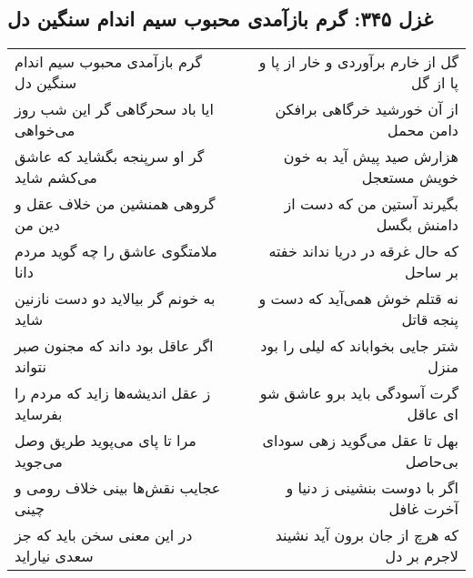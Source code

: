 \begin{center}
\section*{غزل ۳۴۵: گرم بازآمدی محبوب سیم اندام سنگین دل}
\label{sec:345}
\begin{longtable}{l p{0.5cm} r}
گرم بازآمدی محبوب سیم اندام سنگین دل
&&
گل از خارم برآوردی و خار از پا و پا از گل
\\
ایا باد سحرگاهی گر این شب روز می‌خواهی
&&
از آن خورشید خرگاهی برافکن دامن محمل
\\
گر او سرپنجه بگشاید که عاشق می‌کشم شاید
&&
هزارش صید پیش آید به خون خویش مستعجل
\\
گروهی همنشین من خلاف عقل و دین من
&&
بگیرند آستین من که دست از دامنش بگسل
\\
ملامتگوی عاشق را چه گوید مردم دانا
&&
که حال غرقه در دریا نداند خفته بر ساحل
\\
به خونم گر بیالاید دو دست نازنین شاید
&&
نه قتلم خوش همی‌آید که دست و پنجه قاتل
\\
اگر عاقل بود داند که مجنون صبر نتواند
&&
شتر جایی بخواباند که لیلی را بود منزل
\\
ز عقل اندیشه‌ها زاید که مردم را بفرساید
&&
گرت آسودگی باید برو عاشق شو ای عاقل
\\
مرا تا پای می‌پوید طریق وصل می‌جوید
&&
بهل تا عقل می‌گوید زهی سودای بی‌حاصل
\\
عجایب نقش‌ها بینی خلاف رومی و چینی
&&
اگر با دوست بنشینی ز دنیا و آخرت غافل
\\
در این معنی سخن باید که جز سعدی نیاراید
&&
که هرچ از جان برون آید نشیند لاجرم بر دل
\\
\end{longtable}
\end{center}
